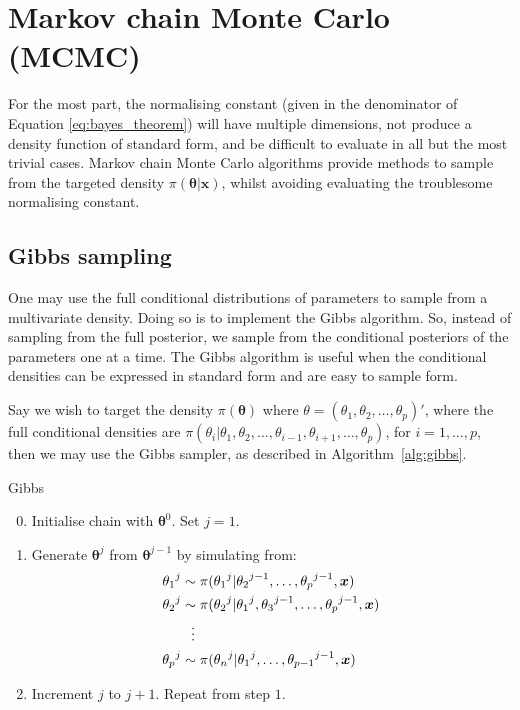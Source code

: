 \section{Markov chain Monte Carlo (MCMC)}
\label{sec:mcmc}
For the most part, the normalising constant (given in the denominator of Equation \eqref{eq:bayes_theorem}) will have multiple dimensions, not produce a density function of standard form, and be difficult to evaluate in all but the most trivial cases. Markov chain Monte Carlo algorithms provide methods to sample from the targeted density $\pi(\bm{\theta}|\bm{x})$, whilst avoiding evaluating the troublesome normalising constant.

\subsection{Gibbs sampling}
\label{ssec:gibbs_sampling}
One may use the full conditional distributions of parameters to sample from a multivariate density. Doing so is to implement the Gibbs algorithm. So, instead of sampling from the full posterior, we sample from the conditional posteriors of the parameters one at a time. The Gibbs algorithm is useful when the conditional densities can be expressed in standard form and are easy to sample form.

Say we wish to target the density $\pi(\bm{\theta})$ where $\theta = (\theta_1, \theta_2, \dots, \theta_p)'$, where the full conditional densities are $\pi(\theta_i|\theta_1, \theta_2, \dots, \theta_{i-1}, \theta_{i+1}, \dots, \theta_p)$, for $i=1,\dots,p$, then we may use the Gibbs sampler, as described in Algorithm~\ref{alg:gibbs}.

\begin{algorithm}
	\caption{Gibbs}
	\label{alg:gibbs}
	\begin{enumerate}
	    \setcounter{enumi}{-1}
	    \item Initialise chain with $\bm{\theta}^{0}$. Set $j=1$.
	    \item Generate $\bm{\theta}^{j}$ from $\bm{\theta}^{j-1}$ by simulating from:
	    \begin{align*}
	            {\theta_1}^{j} &\sim \pi({\theta_1}^{j}|{\theta_2}^{j-1},\dots,{\theta_p}^{j-1},\bm{x})\\
	            {\theta_2}^{j} &\sim \pi({\theta_2}^{j}|{\theta_1}^{j}, {\theta_3}^{j-1}, \dots, {\theta_p}^{j-1},\bm{x})\\
	            &\hspace{0.25cm}\vdots \\
	            {\theta_p}^{j} &\sim \pi({\theta_n}^{j}|{\theta_1}^{j}, \dots, {\theta_{p-1}}^{j-1},\bm{x})
	    \end{align*}
	    \item Increment $j$ to $j+1$. Repeat from step $1$.
	\end{enumerate}
\end{algorithm}


